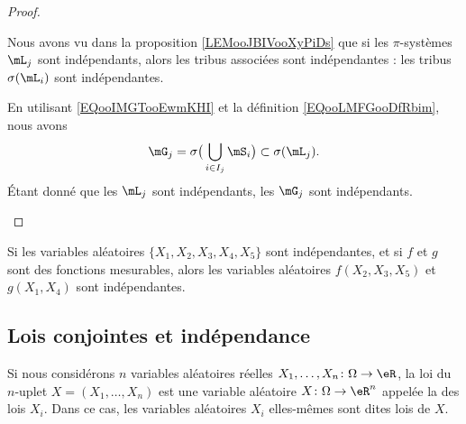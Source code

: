 \begin{proof}
\begin{subproof}
		Nous avons vu dans la proposition \ref{LEMooJBIVooXyPiDs} que si les \( \pi\)-systèmes \( \mL_j\) sont indépendants, alors les tribus associées sont indépendantes : les tribus \( \sigma(\mL_i)\) sont indépendantes.

		En utilisant \eqref{EQooIMGTooEwmKHI} et la définition \eqref{EQooLMFGooDfRbim}, nous avons
		\begin{equation}
			\mG_j=\sigma\big( \bigcup_{i\in I_j}\mS_i \big)\subset \sigma(\mL_j).
		\end{equation}
		Étant donné que les \( \mL_j\) sont indépendants, les \( \mG_j\) sont indépendants.
	\end{subproof}
\end{proof}

\begin{lemma}	\label{LEMooDPGVooDNrUYU}
	Si les variables aléatoires \( \{ X_1,X_2,X_3,X_4,X_5 \}\) sont indépendantes, et si \( f\) et \( g\) sont des fonctions mesurables, alors les variables aléatoires \( f(X_2,X_3,X_5)\) et \( g(X_1,X_4)\) sont indépendantes.
\end{lemma}


\subsection{Lois conjointes et indépendance}

\begin{definition}
	Si nous considérons \( n\) variables aléatoires réelles \( X_1,\ldots,X_n\colon\Omega\to\eR\), la loi du \( n\)-uplet \( X=(X_1,\ldots,X_n)\) est une variable aléatoire \( X\colon \Omega\to \eR^n\) appelée la  des lois \( X_i\). Dans ce cas, les variables aléatoires \( X_i\) elles-mêmes sont dites lois  de \( X\).
\end{definition}


